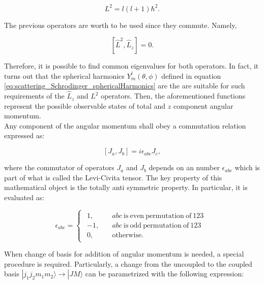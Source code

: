 \documentclass[openany]{book}
\begin{document}
\begin{equation} \label{eq:angularMomentum_L2}
	L^2 = l(l+1)\hbar^2. 
\end{equation}

The previous operators are worth to be used since they commute. Namely, 

\begin{equation} \label{eq:angularMomentum_commutator}
	[\hat L^2, \hat L_z] = 0.
\end{equation}

Therefore, it is possible to find common eigenvalues for both operators. In fact, it turns out that the spherical harmonics $Y^{l}_m(\theta, \phi)$ defined in equation \ref{eq:scattering_Schrodinger_sphericalHarmonics} are the are suitable for such requirements of the $\hat L_z$ and $L^2$ operators. Then, the aforementioned functions represent the possible observable states of total and $z$ component angular momentum.  \\

Any component of the angular momentum shall obey a commutation relation expressed as: 

\begin{equation} \label{eq:angularMomentum_conmutation}
	[J_a, J_b]  = i \epsilon_{abc} J_c,
\end{equation}

where the commutator of operators $J_a$ and $J_b$ depends on an number $\epsilon_{abc}$ which is part of what is called the Levi-Civita tensor. The key property of this mathematical object is the totally anti symmetric property. In particular, it is evaluated as:

\begin{equation} \label{eq:angularMomentum_LeviCivitaTensor}
	\epsilon_{abc} = 	\left\{\begin{array}{l}
		\begin{split}
			1, \quad &abc\mathrm{\ is \ even \ permutation \ of \ 123} \\ 
			-1, \quad &abc\mathrm{\ is \ odd \ permutation \ of \ 123} \\
			0,	\quad &\mathrm{otherwise.}
		\end{split}
	\end{array}\right.
\end{equation}

When change of basis for addition of angular momentum is needed, a special procedure is required. Particularly, a change from the uncoupled to the coupled basis $|j_1j_2m_1m_2 \rangle \rightarrow |JM \rangle$ can be parametrized with the following expression:
\end{document}
